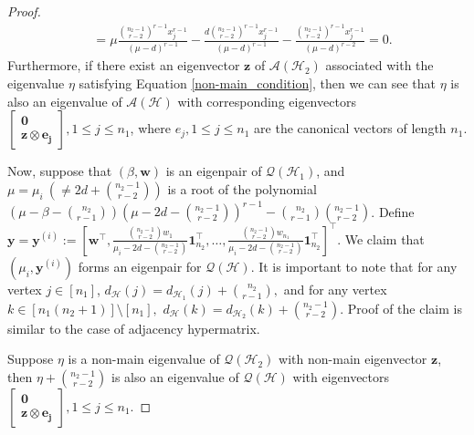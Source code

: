 \documentclass[10pt,a4paper]{amsart}
\begin{document}
\begin{proof}
\begin{align*}
			&= \mu \frac{\binom{n_2-1}{r-2}^{r-1} x_j^{r-1}}{(\mu-d)^{r-1}}- \frac{d\binom{n_2-1}{r-2}^{r-1} x_j^{r-1}}{(\mu-d)^{r-1}} - \frac{\binom{n_2-1}{r-2}^{r-1} x_j^{r-1}}{(\mu-d)^{r-2}} = 0.
		\end{align*}
		Furthermore, if there exist an eigenvector $\mathbf{z}$ of $\mathcal{A}(\mathcal{H}_2)$ associated with the eigenvalue $\eta$ satisfying Equation \ref{non-main_condition}, then we can see that $\eta$ is also an eigenvalue of $\mathcal{A}(\mathcal{H})$ with corresponding eigenvectors $\left[\begin{matrix}
			\mathbf{0} \\ \mathbf{z} \otimes \mathbf{e_j} 
		\end{matrix}\right], 1 \leq j \leq n_1$, where $e_j, 1 \leq j \leq n_1$ are the canonical vectors of length $n_1$.  
		
		Now, suppose that $(\beta, \mathbf{w})$ is an eigenpair of $\mathcal{Q}(\mathcal{H}_1)$, and $\mu = \mu_i~ ( \neq 2d+\binom{n_2-1}{r-2} )$ is a root of the polynomial \\ $\left( \mu-\beta-\binom{n_2}{r-1} \right)\left( \mu-2d-\binom{n_2-1}{r-2} \right)^{r-1}-\binom{n_2}{r-1} \binom{n_2-1}{r-2}$. Define $\mathbf{y}=\mathbf{y}^{(i)} := \left[ \mathbf{w}^\intercal, \frac{\binom{n_2-1}{r-2}w_1}{\mu_i-2d-\binom{n_2-1}{r-2}}\mathbf{1}_{n_2}^{\intercal}, \ldots , \frac{\binom{n_2-1}{r-2}w_{n_1}}{\mu_i-2d-\binom{n_2-1}{r-2} }\mathbf{1}_{n_2}^{\intercal} \right]^\intercal$. We claim that $(\mu_i, \mathbf{y}^{(i)})$ forms an eigenpair for $\mathcal{Q}(\mathcal{H})$.
		It is important to note that for any vertex $j \in [n_1]$,  $d_{\mathcal{H}}(j) = d_{\mathcal{H}_1}(j) + \binom{n_2}{r-1},$ and for any vertex $k \in [n_1(n_2+1)] \setminus [n_1],$ $d_{\mathcal{H}}(k)= d_{\mathcal{H}_2}(k) + \binom{n_2-1}{r-2}.$ 
		Proof of the claim is similar to the case of adjacency hypermatrix.
		
		\noindent Suppose $\eta$ is a non-main eigenvalue of $\mathcal{Q}(\mathcal{H}_2)$ with non-main eigenvector $\mathbf{z}$, then $\eta+\binom{n_2-1}{r-2}$ is also an eigenvalue of $\mathcal{Q}(\mathcal{H})$ with eigenvectors
		$\left[\begin{matrix}
			\mathbf{0} \\ \mathbf{z} \otimes \mathbf{e_j} 
		\end{matrix}\right], 1 \leq j \leq n_1.$
	\end{proof}
\end{document}
